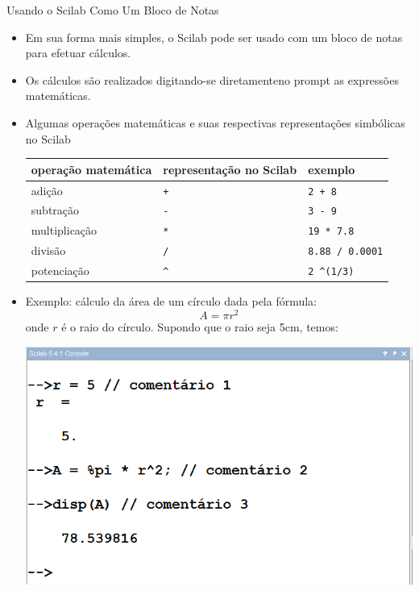 \begin{frame}{Usando o Scilab Como Um Bloco de Notas}
  \begin{itemize}
    \item Em sua forma mais simples, o Scilab pode ser usado com um
    bloco de notas para \alert{efetuar cálculos}.
    \item Os cálculos são realizados digitando-se diretamenteno prompt
    as expressões matemáticas.
    \item Algumas operações matemáticas e suas respectivas
    representações simbólicas no Scilab
    \begin{center}
      \begin{tabular}{lll}\hline
        operação matemática & representação no Scilab & exemplo \\ \hline
        adição & \texttt{+} & \texttt{2 + 8}\\
        subtração & \texttt{-} & \texttt{3 - 9}\\
        multiplicação & \texttt{*} & \texttt{19 * 7.8}\\
        divisão & \texttt{/} & \texttt{8.88 / 0.0001}\\
        potenciação & \texttt{\textasciicircum} & \texttt{2 \textasciicircum (1/3)}\\
        \hline
      \end{tabular}
    \end{center}
    \item Exemplo: cálculo da área de um círculo dada pela fórmula:
    \[ A = \pi r^2 \] onde $r$ é o raio do círculo. Supondo que o
    raio seja 5cm, temos:
    \begin{center}
      \includegraphics[scale=0.4]{images/area.png}
    \end{center}

\end{itemize}
\end{frame}
